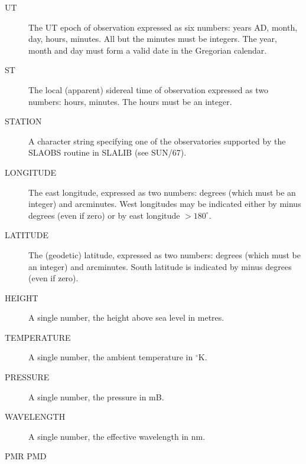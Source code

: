 \documentclass[twoside,11pt]{article}
\newcommand{\xref}[3]{#1}
\newcommand{\xlabel}[1]{}
\renewcommand{\_}{\texttt{\symbol{95}}}
\begin{document}
\begin{description}
\goodbreak
\item[\xlabel{UT}UT]\mbox{}

The UT epoch of observation expressed as six numbers: years AD, month,
day, hours, minutes.  All but the minutes must be integers.  The year,
month and day must form a valid date in the Gregorian calendar.

\goodbreak
\item[\xlabel{ST}ST]\mbox{}

The local (apparent) sidereal time of observation expressed as two
numbers: hours, minutes.  The hours must be an integer.

\goodbreak
\item[\xlabel{STATION}STATION]\mbox{}

A character string specifying one of the observatories supported by
the \xref{SLA\_OBS}{sun67}{SLA_OBS} routine in \xref{SLALIB}{sun67}{}
(see SUN/67).

\goodbreak
\item[\xlabel{LONGITUDE}LONGITUDE]\mbox{}

The east longitude, expressed as two numbers: degrees (which must be an
integer) and arcminutes.  West longitudes may be indicated either by
minus degrees (even if zero) or by east longitude $> 180^\circ$.

\goodbreak
\item[\xlabel{LATITUDE}LATITUDE]\mbox{}

The (geodetic) latitude, expressed as two numbers: degrees (which must
be an integer) and arcminutes.  South latitude is indicated by minus
degrees (even if zero).

\goodbreak
\item[\xlabel{HEIGHT}HEIGHT]\mbox{}

 A single number, the height above sea level in metres.

\goodbreak
\item[\xlabel{TEMPERATURE}TEMPERATURE]\mbox{}

A single number, the ambient temperature in $^\circ$K.

\goodbreak
\item[\xlabel{PRESSURE}PRESSURE]\mbox{}

A single number, the pressure in mB.

\goodbreak
\item[\xlabel{WAVELENGTH}WAVELENGTH]\mbox{}

A single number, the effective wavelength in nm.

\goodbreak
\item[\xlabel{PMR_PMD}PMR PMD]\mbox{}


\end{description}
\end{document}
